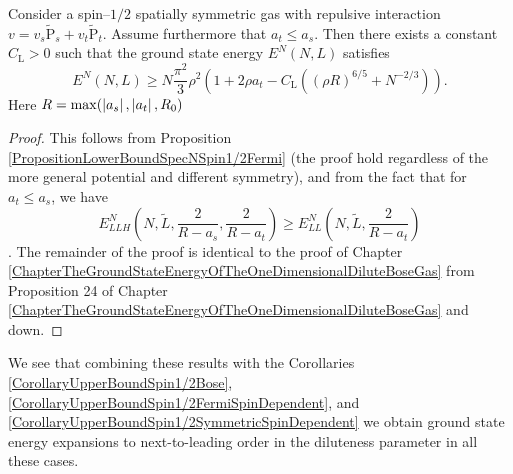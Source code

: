 \begin{theorem}
	\label{TheoremLowerBoundSpinDependentSpin1/2SpatiallySymmetric}
	Consider a spin--$ 1/2 $ spatially symmetric gas with repulsive interaction  $v=v_s\operatorname{\tilde{P}}_s+v_t\operatorname{\tilde{P}}_t$. Assume furthermore that $ a_t\leq a_s $. Then there exists a constant $C_\text{L}>0$ such that the ground state energy $E^N(N,L)$ satisfies
	\begin{equation}
	\label{eqlower}
	E^N(N,L)\geq N\frac{\pi^2}{3}\rho^2\left(1+2\rho a_t-C_\text{L}\left((\rho R)^{6/5}+N^{-2/3}\right)\right).
	\end{equation}
	Here $ R=\max(\left\lvert a_s \right\rvert, \left\lvert a_t \right\rvert, R_0) $
\end{theorem}
\begin{proof}
	This follows from Proposition \ref{PropositionLowerBoundSpecNSpin1/2Fermi} (the proof hold regardless of the more general potential and different symmetry), and from the fact that for $ a_t\leq a_s $, we have $$ E_{LLH}^N\left(N,\tilde{L},\frac{2}{R-a_s},\frac{2}{R-a_t}\right)\geq E^N_{LL}\left(N,\tilde{L},\frac{2}{R-a_t}\right) $$. The remainder of the proof is identical to the proof of Chapter \ref{ChapterTheGroundStateEnergyOfTheOneDimensionalDiluteBoseGas} from Proposition 24 of Chapter \ref{ChapterTheGroundStateEnergyOfTheOneDimensionalDiluteBoseGas} and down.
\end{proof}
We see that combining these results with the Corollaries \ref{CorollaryUpperBoundSpin1/2Bose}, \ref{CorollaryUpperBoundSpin1/2FermiSpinDependent}, and \ref{CorollaryUpperBoundSpin1/2SymmetricSpinDependent} we obtain ground state energy expansions to next-to-leading order in the diluteness parameter in all these cases. 





